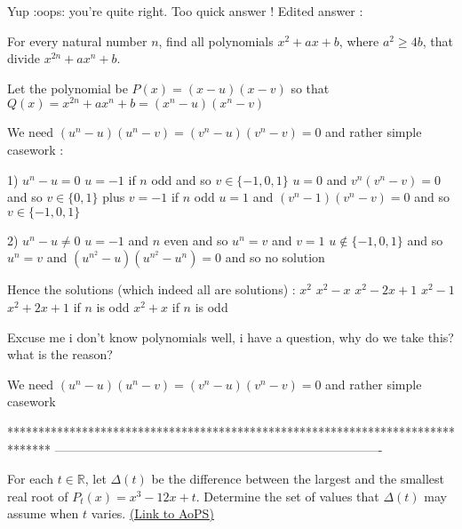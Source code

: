 \begin{solution}
	\begin{tcolorbox}Yup :oops: you're quite right.
Too quick answer !
Edited answer :
\begin{tcolorbox}For every natural number $n$, find all polynomials $x^2+ax+b$, where $a^2 \geq 4b$, that divide $x^{2n} + ax^n + b$.\end{tcolorbox}
Let the polynomial be $P(x)=(x-u)(x-v)$ so that $Q(x)=x^{2n}+ax^n+b=(x^n-u)(x^n-v)$

We need $(u^n-u)(u^n-v)=(v^n-u)(v^n-v)=0$ and rather simple casework :

1) $u^n-u=0$
$u=-1$ if $n$ odd and so $v\in\{-1,0,1\}$
$u=0$ and $v^n(v^n-v)=0$ and so $v\in\{0,1\}$ plus $v=-1$ if $n$ odd
$u=1$ and $(v^n-1)(v^n-v)=0$ and so $v\in\{-1,0,1\}$ 

2) $u^n-u\ne 0$
$u=-1$ and $n$ even and so $u^n=v$ and $v=1$ 
$u\notin\{-1,0,1\}$ and so $u^n=v$ and $(u^{n^2}-u)(u^{n^2}-u^n)=0$ and so no solution

Hence the solutions (which indeed all are solutions) :
$x^2$
$x^2-x$
$x^2-2x+1$
$x^2-1$
$x^2+2x+1$ if $n$ is odd
$x^2+x$ if $n$ is odd\end{tcolorbox}
Excuse me i don't know polynomials well, i have a question, why do we take this? what is the reason?

We need $(u^n-u)(u^n-v)=(v^n-u)(v^n-v)=0$ and rather simple casework
\end{solution}
*******************************************************************************
-------------------------------------------------------------------------------

\begin{problem}
	For each $t \in\mathbb{R}$, let $\Delta(t)$ be the difference between the largest and the smallest real root of $P_t(x)=x^3-12x+t$. Determine the set of values that $\Delta(t)$ may assume when $t$ varies.
	\flushright \href{https://artofproblemsolving.com/community/c6h439530}{(Link to AoPS)}
\end{problem}



